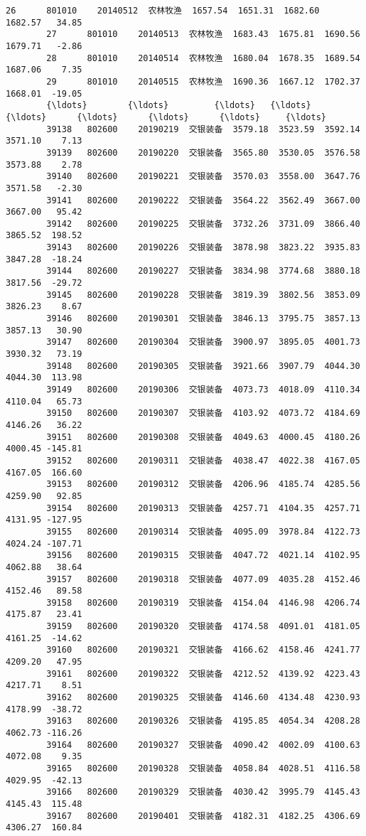 \documentclass[11pt]{article}
\begin{document}
\begin{Verbatim}[commandchars=\\\{\}]
        26      801010    20140512  农林牧渔  1657.54  1651.31  1682.60  1682.57   34.85   
        27      801010    20140513  农林牧渔  1683.43  1675.81  1690.56  1679.71   -2.86   
        28      801010    20140514  农林牧渔  1680.04  1678.35  1689.54  1687.06    7.35   
        29      801010    20140515  农林牧渔  1690.36  1667.12  1702.37  1668.01  -19.05   
        {\ldots}        {\ldots}         {\ldots}   {\ldots}      {\ldots}      {\ldots}      {\ldots}      {\ldots}     {\ldots}   
        39138   802600    20190219  交银装备  3579.18  3523.59  3592.14  3571.10    7.13   
        39139   802600    20190220  交银装备  3565.80  3530.05  3576.58  3573.88    2.78   
        39140   802600    20190221  交银装备  3570.03  3558.00  3647.76  3571.58   -2.30   
        39141   802600    20190222  交银装备  3564.22  3562.49  3667.00  3667.00   95.42   
        39142   802600    20190225  交银装备  3732.26  3731.09  3866.40  3865.52  198.52   
        39143   802600    20190226  交银装备  3878.98  3823.22  3935.83  3847.28  -18.24   
        39144   802600    20190227  交银装备  3834.98  3774.68  3880.18  3817.56  -29.72   
        39145   802600    20190228  交银装备  3819.39  3802.56  3853.09  3826.23    8.67   
        39146   802600    20190301  交银装备  3846.13  3795.75  3857.13  3857.13   30.90   
        39147   802600    20190304  交银装备  3900.97  3895.05  4001.73  3930.32   73.19   
        39148   802600    20190305  交银装备  3921.66  3907.79  4044.30  4044.30  113.98   
        39149   802600    20190306  交银装备  4073.73  4018.09  4110.34  4110.04   65.73   
        39150   802600    20190307  交银装备  4103.92  4073.72  4184.69  4146.26   36.22   
        39151   802600    20190308  交银装备  4049.63  4000.45  4180.26  4000.45 -145.81   
        39152   802600    20190311  交银装备  4038.47  4022.38  4167.05  4167.05  166.60   
        39153   802600    20190312  交银装备  4206.96  4185.74  4285.56  4259.90   92.85   
        39154   802600    20190313  交银装备  4257.71  4104.35  4257.71  4131.95 -127.95   
        39155   802600    20190314  交银装备  4095.09  3978.84  4122.73  4024.24 -107.71   
        39156   802600    20190315  交银装备  4047.72  4021.14  4102.95  4062.88   38.64   
        39157   802600    20190318  交银装备  4077.09  4035.28  4152.46  4152.46   89.58   
        39158   802600    20190319  交银装备  4154.04  4146.98  4206.74  4175.87   23.41   
        39159   802600    20190320  交银装备  4174.58  4091.01  4181.05  4161.25  -14.62   
        39160   802600    20190321  交银装备  4166.62  4158.46  4241.77  4209.20   47.95   
        39161   802600    20190322  交银装备  4212.52  4139.92  4223.43  4217.71    8.51   
        39162   802600    20190325  交银装备  4146.60  4134.48  4230.93  4178.99  -38.72   
        39163   802600    20190326  交银装备  4195.85  4054.34  4208.28  4062.73 -116.26   
        39164   802600    20190327  交银装备  4090.42  4002.09  4100.63  4072.08    9.35   
        39165   802600    20190328  交银装备  4058.84  4028.51  4116.58  4029.95  -42.13   
        39166   802600    20190329  交银装备  4030.42  3995.79  4145.43  4145.43  115.48   
        39167   802600    20190401  交银装备  4182.31  4182.25  4306.69  4306.27  160.84   
        

\end{Verbatim}
\end{document}
